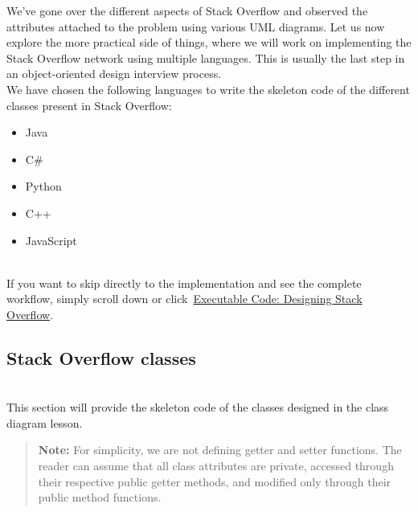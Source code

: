 

We've gone over the different aspects of Stack Overflow and observed the attributes attached to the problem using various UML diagrams. Let us now explore the more practical side of things, where we will work on implementing the Stack Overflow network using multiple languages. This is usually the last step in an object-oriented design interview process.
\\
We have chosen the following languages to write the skeleton code of the different classes present in Stack Overflow:

\begin{itemize}
\item
\protect{}\label{FM09jbN_gaYyJplkwgTn3}
Java
\item
\protect{}\label{9KiWz9epPYOCf0dhSwh5C}
C\#
\item
\protect{}\label{7NQBsSvUXqoSYQLlf7sJX}
Python
\item
\protect{}\label{rOSnN5aLDXv5BltyoRmQW}
C++
\item
\protect{}\label{5tqJBV2aVwS62Og1eMLN1}
JavaScript
\end{itemize}
\\
If you want to skip directly to the implementation and see the complete workflow, simply scroll down or click~\hyperref[Executable-code-Designing-Stack-Overflow]{Executable Code: Designing Stack Overflow}.

\subsection{Stack Overflow classes}\label{xJGQXkMtzc9iBGZqUgigK}
\\
This section will provide the skeleton code of the classes designed in the class diagram lesson.
\begin{quote}
\textbf{Note:} For simplicity, we are not defining getter and setter functions. The reader can assume that all class attributes are private, accessed through their respective public getter methods, and modified only through their public method functions.
\end{quote}
